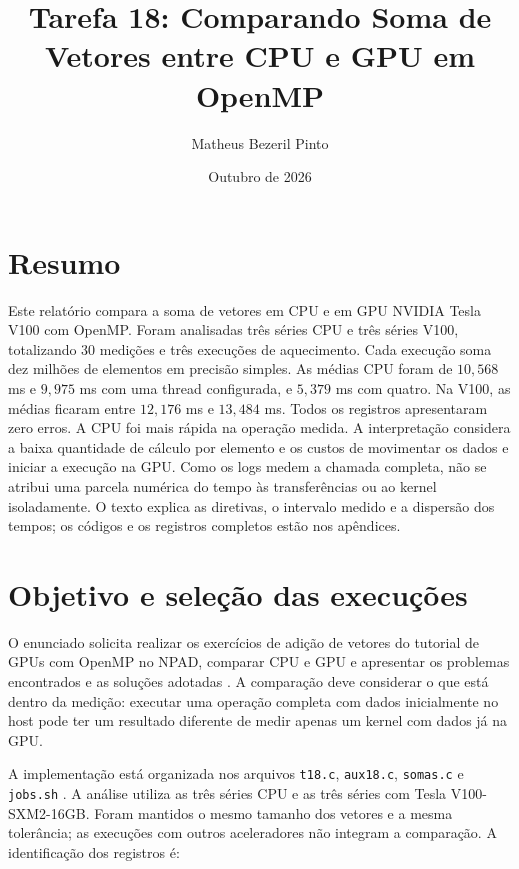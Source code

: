 \documentclass[12pt,a4paper]{article}
\title{\textbf{Tarefa 18: Comparando Soma de Vetores entre CPU e GPU em OpenMP}}
\author{Matheus Bezeril Pinto}
\date{Outubro de 2026}
\begin{document}
\maketitle

\section*{Resumo}
Este relatório compara a soma de vetores em CPU e em GPU NVIDIA Tesla V100 com OpenMP. Foram analisadas três séries CPU e três séries V100, totalizando 30 medições e três execuções de aquecimento. Cada execução soma dez milhões de elementos em precisão simples. As médias CPU foram de $10{,}568$ ms e $9{,}975$ ms com uma thread configurada, e $5{,}379$ ms com quatro. Na V100, as médias ficaram entre $12{,}176$ ms e $13{,}484$ ms. Todos os registros apresentaram zero erros. A CPU foi mais rápida na operação medida. A interpretação considera a baixa quantidade de cálculo por elemento e os custos de movimentar os dados e iniciar a execução na GPU. Como os logs medem a chamada completa, não se atribui uma parcela numérica do tempo às transferências ou ao kernel isoladamente. O texto explica as diretivas, o intervalo medido e a dispersão dos tempos; os códigos e os registros completos estão nos apêndices.

\section{Objetivo e seleção das execuções}
O enunciado solicita realizar os exercícios de adição de vetores do tutorial de GPUs com OpenMP no NPAD, comparar CPU e GPU e apresentar os problemas encontrados e as soluções adotadas \cite{enunciado,tutorial}. A comparação deve considerar o que está dentro da medição: executar uma operação completa com dados inicialmente no host pode ter um resultado diferente de medir apenas um kernel com dados já na GPU.

A implementação está organizada nos arquivos \texttt{t18.c}, \texttt{aux18.c}, \texttt{somas.c} e \texttt{jobs.sh} \cite{repositorio}. A análise utiliza as três séries CPU e as três séries com Tesla V100-SXM2-16GB. Foram mantidos o mesmo tamanho dos vetores e a mesma tolerância; as execuções com outros aceleradores não integram a comparação. A identificação dos registros é:
\end{document}
